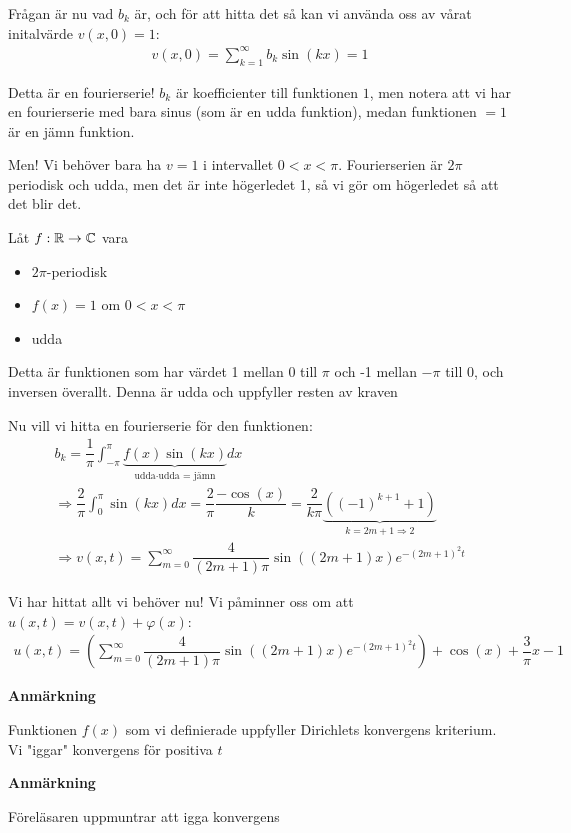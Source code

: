 \par\bigskip
\noindent Frågan är nu vad $b_k$ är, och för att hitta det så kan vi använda oss av vårat initalvärde $v(x,0) = 1$:
\begin{equation*}
  \begin{gathered}
    v(x,0) = \sum_{k=1}^{\infty}b_k\sin(kx) = 1
  \end{gathered}
\end{equation*}\par
\noindent Detta är en fourierserie! $b_k$ är koefficienter till funktionen $1$, men notera att vi har en fourierserie med bara sinus (som är en udda funktion), medan funktionen $=1$ är en jämn funktion.\par
\noindent Men! Vi behöver bara ha $v = 1$ i intervallet $0<x<\pi$. Fourierserien är $2\pi$ periodisk och udda, men det är inte högerledet 1, så vi gör om högerledet så att det blir det.
\par\bigskip
\noindent Låt $f:\mathbb{R}\to\mathbb{C}$ vara\par
\begin{itemize}
  \item $2\pi$-periodisk
  \item $f(x) = 1$ om $0<x<\pi$
  \item udda
\end{itemize}\par
\noindent Detta är funktionen som har värdet 1 mellan 0 till $\pi$ och -1 mellan $-\pi$ till 0, och inversen överallt. Denna är udda och uppfyller resten av kraven
\par\bigskip
\noindent Nu vill vi hitta en fourierserie för den funktionen:
\begin{equation*}
  \begin{gathered}
    b_k = \dfrac{1}{\pi}\int_{-\pi}^{\pi}\underbrace{f(x)\sin(kx)}_{\text{udda$\cdot$udda = jämn}}dx\\
    \Rightarrow \dfrac{2}{\pi}\int_{0}^{\pi}\sin(kx)dx = \dfrac{2}{\pi}\dfrac{-\cos(x)}{k} = \dfrac{2}{k\pi}\underbrace{\left((-1)^{k+1}+1\right)}_{\text{$k = 2m+1\Rightarrow 2$}}\\
    \Rightarrow v(x,t) = \sum_{m=0}^{\infty}\dfrac{4}{(2m+1)\pi}\sin\left((2m+1)x\right)e^{-(2m+1)^2t}
  \end{gathered}
\end{equation*}
\par\bigskip
\noindent Vi har hittat allt vi behöver nu! Vi påminner oss om att $u(x,t) = v(x,t)+\varphi(x)$:
\begin{equation*}
  \begin{gathered}
    u(x,t) = \left(\sum_{m=0}^{\infty}\dfrac{4}{(2m+1)\pi}\sin((2m+1)x)e^{-(2m+1)^2t}\right) + \cos(x)+\dfrac{3}{\pi}x-1
  \end{gathered}
\end{equation*}
\par\bigskip
\noindent\textbf{Anmärkning}\par
\noindent Funktionen $f(x)$ som vi definierade uppfyller Dirichlets konvergens kriterium. Vi "iggar" konvergens för positiva $t$
\par\bigskip
\noindent\textbf{Anmärkning}\par
\noindent Föreläsaren uppmuntrar att igga konvergens
